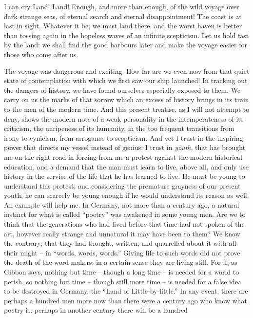  I can cry Land! Land! Enough, and more
than enough, of the wild voyage over dark strange seas, of eternal
search and eternal disappointment! The coast is at last in sight.
Whatever it be, we must land there, and the worst haven is better
than tossing again in the hopeless waves of an infinite scepticism.
Let us hold fast by the land: we shall find the good harbours later
and make the voyage easier for those who come after us.

The voyage was dangerous and exciting. How far are we even now from
that quiet state of contemplation with which we first saw our ship
launched! In tracking out the dangers of history, we have found
ourselves especially exposed to them. We carry on us the marks of
that sorrow which an excess of history brings in its train to the men
of the modern time. And this present treatise, as I will not attempt
to deny, shows the modern note of a weak personality in the
intemperateness of its criticism, the unripeness of its humanity, in
the too frequent transitions from irony to cynicism, from arrogance
to scepticism. And yet I trust in the inspiring power that directs my
vessel instead of genius; I trust in \textit{youth}, that has brought me on
the right road in forcing from me a protest against the modern
historical education, and a demand that the man must learn to live,
above all, and only use history in the service of the life that he
has learned to live. He must be young to understand this protest; and
considering the premature grayness of our present youth, he can
scarcely be young enough if he would understand its reason as well.
An example will help me. In Germany, not more than a century ago, a
natural instinct for what is called \enquote{poetry} was awakened in some
young men. Are we to think that the generations who had lived before
that time had not spoken of the art, however really strange and
unnatural it may have been to them? We know the contrary; that they
had thought, written, and quarrelled about it with all their
might -- in \enquote{words, words, words.} Giving life to such words did not
prove the death of the word-makers; in a certain sense they are
living still. For if, as Gibbon says, nothing but time -- though a long
time -- is needed for a world to perish, so nothing but time -- though
still more time -- is needed for a false idea to be destroyed in
Germany, the \enquote{Land of Little-by-little.} In any event, there are
perhaps a hundred men more now than there were a century ago who know
what poetry is: perhaps in another century there will be a hundred
